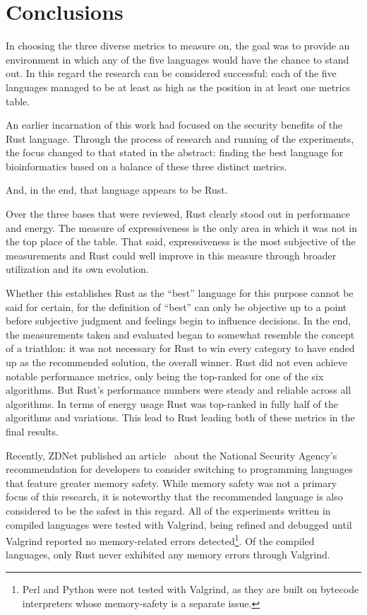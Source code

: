 \section{Conclusions}
\label{sec:conclusions}

In choosing the three diverse metrics to measure on, the goal was to provide an environment in which any of the five languages would have the chance to stand out. In this regard the research can be considered successful: each of the five languages managed to be at least as high as the  position in at least one metrics table.

An earlier incarnation of this work had focused on the security benefits of the Rust language. Through the process of research and running of the experiments, the focus changed to that stated in the abstract: finding the best language for bioinformatics based on a balance of these three distinct metrics.

And, in the end, that language appears to be Rust.

Over the three bases that were reviewed, Rust clearly stood out in performance and energy. The measure of expressiveness is the only area in which it was not in the top place of the table. That said, expressiveness is the most subjective of the measurements and Rust could well improve in this measure through broader utilization and its own evolution.

Whether this establishes Rust as the ``best'' language for this purpose cannot be said for certain, for the definition of ``best'' can only be objective up to a point before subjective judgment and feelings begin to influence decisions. In the end, the measurements taken and evaluated began to somewhat resemble the concept of a triathlon: it was not necessary for Rust to win every category to have ended up as the recommended solution, the overall winner. Rust did not even achieve notable performance metrics, only being the top-ranked for one of the six algorithms. But Rust's performance numbers were steady and reliable across all algorithms. In terms of energy usage Rust was top-ranked in fully half of the algorithms and variations. This lead to Rust leading both of these metrics in the final results.

Recently, ZDNet published an article~\cite{tung} about the National Security Agency's recommendation for developers to consider switching to programming languages that feature greater memory safety. While memory safety was not a primary focus of this research, it is noteworthy that the recommended language is also considered to be the safest in this regard. All of the experiments written in compiled languages were tested with Valgrind, being refined and debugged until Valgrind reported no memory-related errors detected\footnote{Perl and Python were not tested with Valgrind, as they are built on bytecode interpreters whose memory-safety is a separate issue.}. Of the compiled languages, only Rust never exhibited any memory errors through Valgrind.

